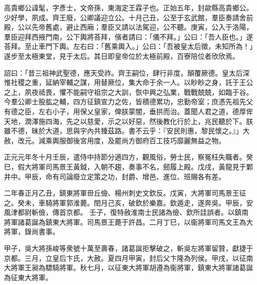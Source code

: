 \begin{pinyinscope}
 
 
 高貴鄉公諱髦，字彥士，文帝孫，東海定王霖子也。正始五年，封歘縣高貴鄉公。少好學，夙成。齊王廢，公卿議迎立公。十月己丑，公至于玄武館，羣臣奏請舍前殿，公以先帝舊處，避止西廂；羣臣又請以法駕迎，公不聽。庚寅，公入于洛陽，羣臣迎拜西掖門南，公下輿將荅拜，儐者請曰：「儀不拜。」公曰：「吾人臣也。」遂荅拜。至止車門下輿。左右曰：「舊乘輿入。」公曰：「吾被皇太后徵，未知所為！」遂步至太極東堂，見于太后。其日即皇帝位於太極前殿，百寮陪位者欣欣焉。
 
 
 詔曰：「昔三祖神武聖德，應天受祚。齊王嗣位，肆行非度，顛覆厥德。皇太后深惟社稷之重，延納宰輔之謀，用替厥位，集大命于余一人。以眇眇之身，託于王公之上，夙夜祗畏，懼不能嗣守祖宗之大訓，恢中興之弘業，戰戰兢兢，如臨于谷。今羣公卿士股肱之輔，四方征鎮宣力之佐，皆積德累功，忠勤帝室；庶憑先祖先父有德之臣，左右小子，用保乂皇家，俾朕蒙闇，垂拱而治。蓋聞人君之道，德厚侔天地，潤澤施四海，先之以慈愛，示之以好惡，然後教化行於上，兆民聽於下。朕雖不德，昧於大道，思與宇內共臻茲路。書不云乎：『安民則惠，黎民懷之。』」大赦，改元。減乘輿服御後宮用度，及罷尚方御府百工技巧靡麗無益之物。
 
 
 
 
 正元元年冬十月壬辰，遣侍中持節分適四方，觀風俗，勞士民，察冤枉失職者。癸巳，假大將軍司馬景王黃鉞，入朝不趨，奏事不名，劒履上殿。戊戌，黃龍見于鄴井中。甲辰，命有司論廢立定策之功，封爵、增邑、進位、班賜各有差。
 
 
二年春正月乙丑，鎮東將軍毌丘儉、楊州刺史文欽反。戊寅，大將軍司馬景王征之。癸未，車騎將軍郭淮薨。閏月己亥，破欽於樂嘉。欽遁走，遂奔吳。甲辰，安風津都尉斬儉，傳首京都。
 壬子，復特赦淮南士民諸為儉、欽所詿誤者。以鎮南將軍諸葛誕為鎮東大將軍。司馬景王薨于許昌。二月丁巳，以衞將軍司馬文王為大將軍，錄尚書事。
 
 
 
 
 甲子，吳大將孫峻等衆號十萬至壽春，諸葛誕拒擊破之，斬吳左將軍留贊，獻捷于京都。三月，立皇后卞氏，大赦。夏四月甲寅，封后父卞隆為列侯。甲戌，以征南大將軍王昶為驃騎將軍。秋七月，以征東大將軍胡遵為衞將軍，鎮東大將軍諸葛誕為征東大將軍。
 

\end{pinyinscope}
